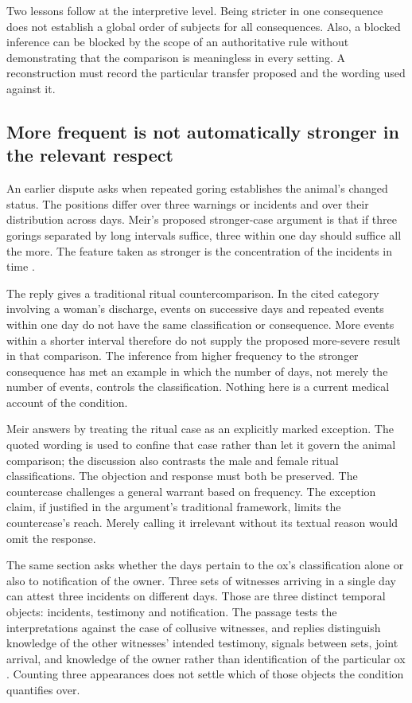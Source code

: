 Two lessons follow at the interpretive level. Being stricter in one
consequence does not establish a global order of subjects for all
consequences. Also, a blocked inference can be blocked by the scope
of an authoritative rule without demonstrating that the comparison
is meaningless in every setting. A reconstruction must record
the particular transfer proposed and the wording used against it.

\subsection{More frequent is not automatically stronger in the relevant respect}
\label{sec:p18-talmudic-frequency-countercase}

An earlier dispute asks when repeated goring establishes the
animal's changed status. The positions differ over three warnings
or incidents and over their distribution across days.
Meir's proposed stronger-case argument is that if three gorings
separated by long intervals suffice, three within one day should
suffice all the more. The feature taken as stronger is the
concentration of the incidents in time
\parencite[pp.~47--48]{RodkinsonBabaKamaCopyright1900}.

The reply gives a traditional ritual countercomparison. In the
cited category involving a woman's discharge, events on successive
days and repeated events within one day do not have the same
classification or consequence. More events within a shorter interval
therefore do not supply the proposed more-severe result in that
comparison. The inference from higher frequency to the stronger
consequence has met an example in which the number of days,
not merely the number of events, controls the classification.
Nothing here is a current medical account of the condition.

Meir answers by treating the ritual case as an explicitly marked
exception. The quoted wording is used to confine that case rather
than let it govern the animal comparison; the discussion also
contrasts the male and female ritual classifications.
The objection and response must both be preserved. The countercase
challenges a general warrant based on frequency. The exception
claim, if justified in the argument's traditional framework,
limits the countercase's reach. Merely calling it irrelevant
without its textual reason would omit the response.

The same section asks whether the days pertain to the ox's
classification alone or also to notification of the owner. Three
sets of witnesses arriving in a single day can attest three
incidents on different days. Those are three distinct temporal
objects: incidents, testimony and notification. The passage tests
the interpretations against the case of collusive witnesses, and
replies distinguish knowledge of the other witnesses' intended
testimony, signals between sets, joint arrival, and knowledge of
the owner rather than identification of the particular ox
\parencite[pp.~48--50]{RodkinsonBabaKamaCopyright1900}.
Counting three appearances does not settle which of those objects
the condition quantifies over.


